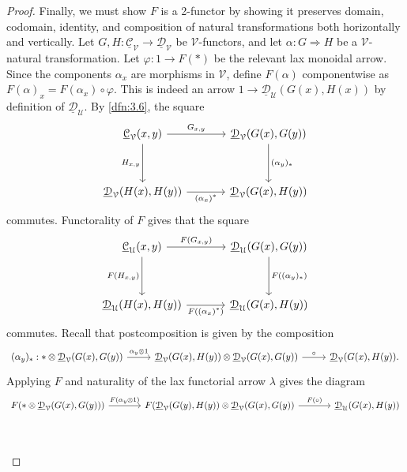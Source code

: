 \begin{proof}
	Finally, we must show $F$ is a 2-functor by showing it preserves domain, codomain, identity, and composition of natural transformations both horizontally and vertically. Let $G,H : \underline{\mathcal{C} } _\mathcal{V}  \to \underline{\mathcal{D} } _\mathcal{V} $ be $\mathcal{V} $-functors, and let $\alpha : G \Rightarrow H$ be a $\mathcal{V} $-natural transformation. Let $\varphi : 1 \to F(*)$ be the relevant lax monoidal arrow. Since the components $\alpha_x$ are morphisms in $\mathcal{V} $, define $F(\alpha)$ componentwise as $F(\alpha)_x=F(\alpha_x)\circ \varphi$. This is indeed an arrow $1\to \underline{\mathcal{D} } _\mathcal{U} (G(x),H(x))$ by definition of $\underline{\mathcal{D} } _\mathcal{U} $. By \cref{dfn:3.6}, the square
	\[\begin{tikzcd}[row sep = 3.5em, column sep = 3.5em]
	\underline{\mathcal{C} } _\mathcal{V} (x,y)\ar[" G_{x\text{,} y}  ", r] \ar[" H_{x\text{,} y}  "', d]  & \underline{\mathcal{D} } _\mathcal{V} (G(x),G(y))\ar[" (\alpha_y)_* ", d]  \\
	\underline{\mathcal{D} } _\mathcal{V} (H(x),H(y))\ar[" (\alpha_x)^* "', r]  & \underline{\mathcal{D} } _\mathcal{V} (G(x),H(y))
	\end{tikzcd}\]
	commutes. Functorality of $F$ gives that the square
	\[\begin{tikzcd}[row sep = 3.5em, column sep = 3.5em]
		\underline{\mathcal{C} }_\mathcal{U} (x,y)\ar[" F(G_{x\text{,} y})  ", r] \ar[" F(H_{x\text{,} y})  "', d]  & \underline{\mathcal{D} } _\mathcal{U} (G(x),G(y))\ar[" F((\alpha_y)_*) ", d]  \\
	\underline{\mathcal{D} }_\mathcal{U}  (H(x),H(y))\ar[" F((\alpha_x)^*) "', r]  & \underline{\mathcal{D} } _\mathcal{U} (G(x),H(y))
	\end{tikzcd}\]
	commutes. Recall that postcomposition is given by the composition
	\[\begin{tikzcd}[row sep = 2.5em, column sep = 2.5em]
		(\alpha_y)_* : *\otimes \underline{\mathcal{D} } _\mathcal{V} (G(x),G(y))\ar[" \alpha_y \otimes 1", r] & \underline{\mathcal{D} } _\mathcal{V} (G(x),H(y))\otimes \underline{\mathcal{D} } _\mathcal{V} (G(x),G(y))\ar[" \circ  ", r]  & \underline{\mathcal{D} } _\mathcal{V} (G(x),H(y)).
	\end{tikzcd}\]
	Applying $F$ and naturality of the lax functorial arrow $\lambda$ gives the diagram
	\[\begin{tikzcd}[row sep = 3.5em, column sep = 3.5em]
	F(*\otimes \underline{\mathcal{D} } _\mathcal{V} (G(x),G(y))) \ar[" F(\alpha_y\otimes 1) ", r] & F(\underline{\mathcal{D} } _\mathcal{V} (G(y),H(y))\otimes \underline{\mathcal{D} } _\mathcal{V} (G(x),G(y))\ar[" F(\circ ) ", r]  & \underline{\mathcal{D} } _\mathcal{U} (G(x),H(y)) \\

\end{tikzcd}\]
\end{proof}
